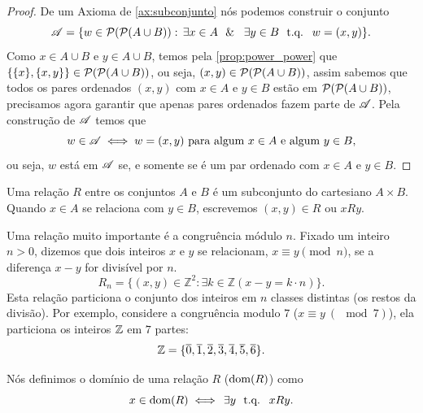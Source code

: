 \begin{proof}
    De um Axioma de \autoref{ax:subconjunto} nós podemos construir o conjunto
    \[
        \AAA = \{w \in \PP(\PP(A \cup B)): \exists x \in A \e \exists y \in B \tq w = (x,y) \}.
    \]
    Como \(x \in A \cup B\) e \(y \in A \cup B\), temos pela \autoref{prop:power_power} que \(\{\{x\}, \{x,y\}\} \in \mathcal{P}(\mathcal{P}(A \cup B))\), ou seja, \((x,y) \in \mathcal{P}(\mathcal{P}(A \cup B))\), assim sabemos que todos os pares ordenados \((x,y)\) com \(x \in A\) e \(y \in B\) estão em \(\mathcal{P}(\mathcal{P}(A \cup B))\), precisamos agora garantir que apenas pares ordenados fazem parte de \(\mathscr{A}\). Pela construção de \(\mathscr{A}\) temos que
    \[
        w \in \mathscr{A} \iff w = (x,y) \text{ para algum } x \in A \text{ e algum } y \in B,
    \]
    ou seja, \(w\) está em \(\mathscr{A}\) se, e somente se é um par ordenado com \(x \in A\) e \(y \in B\).
\end{proof}

\begin{definicao}[Relação]
    \label{def:relacao}
    Uma relação \(R\) entre os conjuntos \(A\) e \(B\) é um subconjunto do cartesiano \(A \times B\). Quando \(x \in A\) se relaciona com \(y \in B\), escrevemos \((x,y) \in R\) ou \(xRy\).
\end{definicao}



\begin{exemplo}
    Uma relação muito importante é a congruência módulo \(n\). Fixado um inteiro \(n > 0\), dizemos que dois inteiros \(x\) e \(y\) se relacionam, \(x \equiv y \pmod{n}\), se a diferença \(x - y\) for divisível por \(n\).
    \[
        R_n = \{(x,y) \in \mathbb{Z}^2 : \exists k \in \mathbb{Z} (x - y = k \cdot n)\}.
    \]
    Esta relação particiona o conjunto dos inteiros em \(n\) classes distintas (os restos da divisão). Por exemplo, considere a congruência modulo \(7\) (\(x \equiv y \ (\mod 7)\)), ela particiona os inteiros \(\mathbb{Z}\) em \(7\) partes:
    \[
        \mathbb{Z} = \{\overline{0}, \overline{1}, \overline{2}, \overline{3}, \overline{4}, \overline{5}, \overline{6}\}.
    \]
\end{exemplo}

\begin{definicao}[Domínio]
    \label{def:dominio}
    Nós definimos o domínio de uma relação \(R\) (\(\text{dom} (R)\)) como
    \[
        x \in \dom (R) \iff \exists y \tq xRy.
    \]
\end{definicao}




